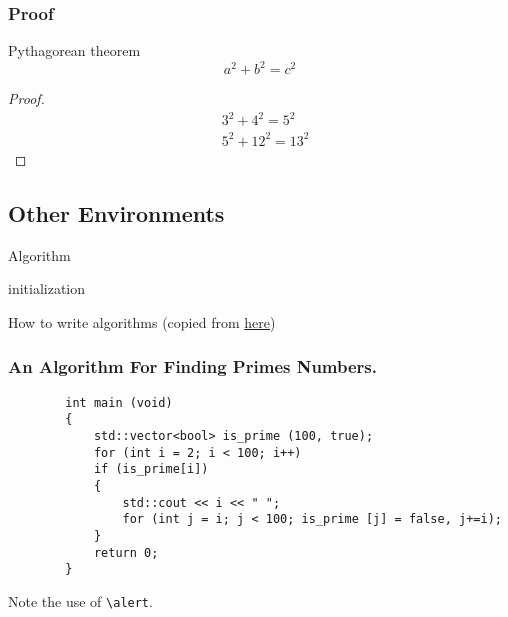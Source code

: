 \begin{frame}
    \frametitle{Proof}

    \begin{block}{Pythagorean theorem}
        \vspace*{-\baselineskip}\setlength\belowdisplayshortskip{0.1pt}
        $$a^2 + b^2 = c^2$$
    \end{block}
    
    \vspace{0.4cm}

    \begin{proof}
        \vspace*{-\baselineskip}\setlength\belowdisplayshortskip{0pt}
        \begin{align*}
            &3^2 + 4^2 = 5^2\\
            &5^2 + 12^2 = 13^2
        \end{align*}
    \end{proof}
\end{frame}

\subsection{Other Environments}

\begin{frame}{Algorithm}
    \scriptsize
    \begin{algorithm}[H]
        initialization\;
        \caption{How to write algorithms
        (copied from \href{https://en.wikibooks.org/wiki/LaTeX/Algorithms}{here})}
        \end{algorithm}
\end{frame}

\begin{frame}[fragile]
    \frametitle{An Algorithm For Finding Primes Numbers.}
    \scriptsize
    \begin{verbatim}
        int main (void)
        {
            std::vector<bool> is_prime (100, true);
            for (int i = 2; i < 100; i++)
            if (is_prime[i])
            {
                std::cout << i << " ";
                for (int j = i; j < 100; is_prime [j] = false, j+=i);
            }
            return 0;
        }
    \end{verbatim}

    \vspace{-0.7cm}

    \begin{uncoverenv}
    Note the use of \verb|\alert|.
    \end{uncoverenv}
\end{frame}

